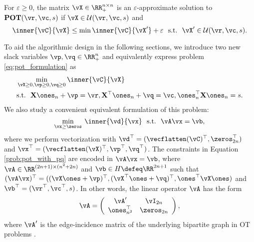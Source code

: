 \begin{definition}
For $\varepsilon \geq 0$, the matrix $\vX \in \RR_{+}^{n \times n} $ is an $\varepsilon$-approximate solution to $ \mathbf{POT}(\vr, \vc, s)$ if $\vX \in \mathcal{U}(\vr, \vc, s)$ and
\begin{equation*}
    \inner{\vC}{{\vX}} \leq \min \inner{\vC}{\vX'} + \varepsilon ~~ \text{s.t.} ~~ \vX' \in \mathcal{U}(\vr, \vc, s).
\end{equation*}
\end{definition}

To aid the algorithmic design in the following sections, we introduce two new slack variables $\vp, \vq \in \RR_+^{n}$ and equivalently express problem \eqref{eq:pot_formulation} as
\begin{align}
    \label{prob:pot_with_pq}
        &\min_{\vX \geq 0, \vp \geq 0, \vq \geq 0} \inner{\vC}{\vX} \\
        &\text{s.t. } \: \mathbf{X} \ones_n + \vp = \vr, \mathbf{X}^\top \ones_n + \vq = \vc, \ones_n^\top \mathbf{X} \ones_n = s.
\end{align}
We also study a convenient equivalent formulation of this problem:
\begin{equation} \label{main_problem}
    \min_{\vx \geq \zeros} \:  \inner{\vd}{\vx} ~~ \text{s.t.} ~~ \vA\vx = \vb,
\end{equation}
where we perform vectorization with $\vd^\top = (\vecflatten(\vC)^\top, \zeros_{2n}^\top)$ and  $\vx^\top = (\vecflatten(\vX)^\top, \vp^\top, \vq^\top)$. 
The  constraints in Equation \ref{prob:pot_with_pq} are encoded in $\vA\vx = \vb$, where $\vA \in \RR^{(2n + 1) \times (n^2+2n)}$ and $\vb \in H \defeq \RR^{2n+1}$ such that $(\vA \vx)^\top = ((\vX \ones + \vp)^\top, (\vX^\top \ones + \vq)^\top, \ones^\top \vX \ones)$ and $\vb^\top = (\vr^\top, \vc^\top, s)$. In other words, the linear operator $\vA$ has the form
\begin{equation*} \label{matrix_A}
    \vA = \left(
    \begin{array}{cc}
    \vA' & \vI_{2n} \\
    \ones_{n^2}^\top & \zeros_{2n}
    \end{array} \right),
\end{equation*}
where $\vA'$ is the edge-incidence matrix of the underlying bipartite graph in OT problems \citep{Dvurechensky-2018-Computational,Jambulapati-2019-Direct}.

